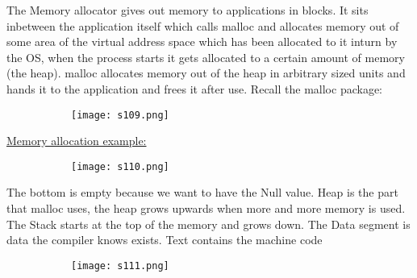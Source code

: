 \documentclass[8pt]{extreport}
\begin{document}
The Memory allocator gives out memory to applications in blocks. It sits inbetween the application itself which calls malloc and allocates memory out of some area of the virtual address space which has been allocated to it inturn by the OS, when the process starts it gets allocated to a certain amount of memory (the heap). malloc allocates memory out of the heap in arbitrary sized units and hands it to the application and frees it after use.
Recall the malloc package:
\begin{figure}[H]
\centering
\begin{subfigure}[b]{0.4\linewidth}
\texttt{[image: s109.png]}
\end{subfigure}
\end{figure}
\underline{Memory allocation example:}
\begin{figure}[H]
\centering
\begin{subfigure}[b]{0.4\linewidth}
\texttt{[image: s110.png]}
\end{subfigure}
\end{figure}
The bottom is empty because we want to have the Null value. Heap is the part that malloc uses, the heap grows upwards when more and more memory is used. The Stack starts at the top of the memory and grows down. The Data segment is data the compiler knows exists. Text contains the machine code
\begin{figure}[H]
\centering
\begin{subfigure}[b]{0.4\linewidth}
\texttt{[image: s111.png]}
\end{subfigure}
\end{figure}
\end{document}
